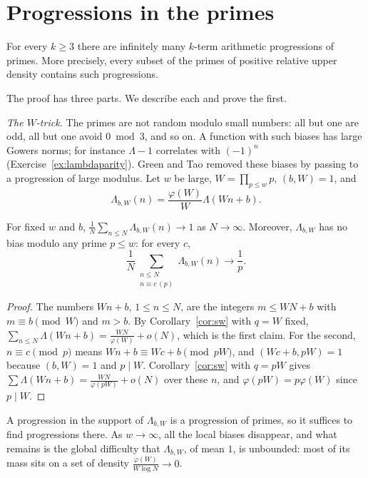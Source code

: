 \section{Progressions in the primes}

\begin{theorem}\label{thm:greentao}
For every $k\ge3$ there are infinitely many $k$-term arithmetic progressions of primes. More precisely, every subset of the primes of positive relative upper density contains such progressions.
\end{theorem}

The proof has three parts. We describe each and prove the first.

\emph{The $W$-trick.} The primes are not random modulo small numbers: all but one are odd, all but one avoid $0\bmod3$, and so on. A function with such biases has large Gowers norms; for instance $\Lambda-1$ correlates with $(-1)^n$ (Exercise~\ref{ex:lambdaparity}). Green and Tao removed these biases by passing to a progression of large modulus. Let $w$ be large, $W=\prod_{p\le w}p$, $(b,W)=1$, and
\[
\Lambda_{b,W}(n)=\frac{\varphi(W)}W\Lambda(Wn+b).
\]

\begin{lemma}\label{lem:wtrick}
For fixed $w$ and $b$, $\frac1N\sum_{n\le N}\Lambda_{b,W}(n)\to1$ as $N\to\infty$. Moreover, $\Lambda_{b,W}$ has no bias modulo any prime $p\le w$: for every $c$,
\[
\frac1N\sum_{\substack{n\le N\\n\equiv c\,(p)}}\Lambda_{b,W}(n)\to\frac1p.
\]
\end{lemma}
\begin{proof}
The numbers $Wn+b$, $1\le n\le N$, are the integers $m\le WN+b$ with $m\equiv b\pmod W$ and $m>b$. By Corollary~\ref{cor:sw} with $q=W$ fixed, $\sum_{n\le N}\Lambda(Wn+b)=\frac{WN}{\varphi(W)}+o(N)$, which is the first claim. For the second, $n\equiv c\pmod p$ means $Wn+b\equiv Wc+b\pmod{pW}$, and $(Wc+b,pW)=1$ because $(b,W)=1$ and $p\mid W$. Corollary~\ref{cor:sw} with $q=pW$ gives $\sum\Lambda(Wn+b)=\frac{WN}{\varphi(pW)}+o(N)$ over these $n$, and $\varphi(pW)=p\varphi(W)$ since $p\mid W$.
\end{proof}

A progression in the support of $\Lambda_{b,W}$ is a progression of primes, so it suffices to find progressions there. As $w\to\infty$, all the local biases disappear, and what remains is the global difficulty that $\Lambda_{b,W}$, of mean $1$, is unbounded: most of its mass sits on a set of density $\frac{\varphi(W)}{W\log N}\to0$.

